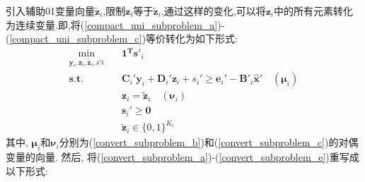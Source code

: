 \documentclass{article}
\begin{document}
引入辅助01变量向量$\tilde{\mathbf{z}}_i$,限制$\mathbf{z}_i$等于$\tilde{\mathbf{z}}_i$,通过这样的变化,可以将$\mathbf{z}_i$中的所有元素转化为连续变量.即,将(\ref{compact_uni_subproblem_a})-(\ref{compact_uni_subproblem_c})等价转化为如下形式:
\begin{subequations}
    \begin{align}
        \min_{\mathbf{y}_{i},\mathbf{z}_{i},{\tilde{\boldsymbol{z}}}_{i},s'{i}}\quad& \mathbf{1}^{\mathbf{T}}\mathbf{s}'_{i} \label{convert_subproblem_a} \\
        \mathbf{s.t.}\quad & \mathbf{C}_{i}'\mathbf{y}_{i}+\mathbf{D}_{i}'\mathbf{z}_{i}+s_{i}'\geq\mathbf{e}_{i}'-\mathbf{B}'_{i}\hat{\mathbf{x}}'\quad(\bm{\mu}_{i})  \label{convert_subproblem_b} \\
        &\mathbf{z}_{i}=\tilde{\mathbf{z}}_{i}\quad(\bm{\nu}_{i}) \label{convert_subproblem_c} \\
        &\mathbf{s}_{i}'\geq\mathbf{0} \label{convert_subproblem_d} \\
        &\tilde{\mathbf{z}}_{i}\in\{0,1\}^{K_{i}} \label{convert_subproblem_e} 
    \end{align}
\end{subequations}
其中, $\bm{\mu}_i$和$\bm{\nu}_i$分别为(\ref{convert_subproblem_b})和(\ref{convert_subproblem_c})的对偶变量的向量. 然后, 将(\ref{convert_subproblem_a})-(\ref{convert_subproblem_e})重写成以下形式:
\end{document}
